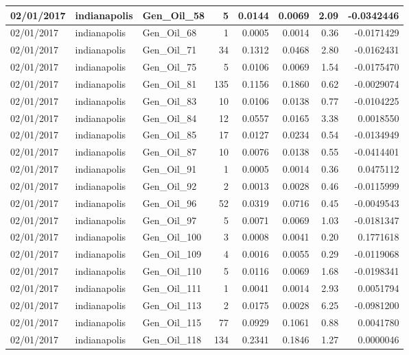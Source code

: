 \documentclass[
  letterpaper,
  DIV=11,
  numbers=noendperiod]{scrartcl}
\begin{document}
\begin{tabular}{l|l|l|r|r|r|r|r}
\hline
02/01/2017 & indianapolis & Gen\_Oil\_58 & 5 & 0.0144 & 0.0069 & 2.09 & -0.0342446\\
\hline
02/01/2017 & indianapolis & Gen\_Oil\_68 & 1 & 0.0005 & 0.0014 & 0.36 & -0.0171429\\
\hline
02/01/2017 & indianapolis & Gen\_Oil\_71 & 34 & 0.1312 & 0.0468 & 2.80 & -0.0162431\\
\hline
02/01/2017 & indianapolis & Gen\_Oil\_75 & 5 & 0.0106 & 0.0069 & 1.54 & -0.0175470\\
\hline
02/01/2017 & indianapolis & Gen\_Oil\_81 & 135 & 0.1156 & 0.1860 & 0.62 & -0.0029074\\
\hline
02/01/2017 & indianapolis & Gen\_Oil\_83 & 10 & 0.0106 & 0.0138 & 0.77 & -0.0104225\\
\hline
02/01/2017 & indianapolis & Gen\_Oil\_84 & 12 & 0.0557 & 0.0165 & 3.38 & 0.0018550\\
\hline
02/01/2017 & indianapolis & Gen\_Oil\_85 & 17 & 0.0127 & 0.0234 & 0.54 & -0.0134949\\
\hline
02/01/2017 & indianapolis & Gen\_Oil\_87 & 10 & 0.0076 & 0.0138 & 0.55 & -0.0414401\\
\hline
02/01/2017 & indianapolis & Gen\_Oil\_91 & 1 & 0.0005 & 0.0014 & 0.36 & 0.0475112\\
\hline
02/01/2017 & indianapolis & Gen\_Oil\_92 & 2 & 0.0013 & 0.0028 & 0.46 & -0.0115999\\
\hline
02/01/2017 & indianapolis & Gen\_Oil\_96 & 52 & 0.0319 & 0.0716 & 0.45 & -0.0049543\\
\hline
02/01/2017 & indianapolis & Gen\_Oil\_97 & 5 & 0.0071 & 0.0069 & 1.03 & -0.0181347\\
\hline
02/01/2017 & indianapolis & Gen\_Oil\_100 & 3 & 0.0008 & 0.0041 & 0.20 & 0.1771618\\
\hline
02/01/2017 & indianapolis & Gen\_Oil\_109 & 4 & 0.0016 & 0.0055 & 0.29 & -0.0119068\\
\hline
02/01/2017 & indianapolis & Gen\_Oil\_110 & 5 & 0.0116 & 0.0069 & 1.68 & -0.0198341\\
\hline
02/01/2017 & indianapolis & Gen\_Oil\_111 & 1 & 0.0041 & 0.0014 & 2.93 & 0.0051794\\
\hline
02/01/2017 & indianapolis & Gen\_Oil\_113 & 2 & 0.0175 & 0.0028 & 6.25 & -0.0981200\\
\hline
02/01/2017 & indianapolis & Gen\_Oil\_115 & 77 & 0.0929 & 0.1061 & 0.88 & 0.0041780\\
\hline
02/01/2017 & indianapolis & Gen\_Oil\_118 & 134 & 0.2341 & 0.1846 & 1.27 & 0.0000046\\

\end{tabular}
\end{document}
